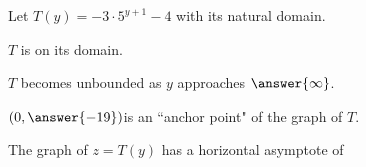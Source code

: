 \documentclass{ximera}
\author{Lee Wayand}
\begin{document}
\begin{exercise}




Let $T(y) = -3 \cdot 5^{y+1} - 4$ with its natural domain.


\begin{question}


$T$ is  on its domain. \\


\end{question}







\begin{question}


$T$ becomes unbounded as $y$ approaches $\answer{\infty}$.


\end{question}





\begin{question}


$\left( 0, \answer{-19} \right) $is an ``anchor point" of the graph of $T$. \\


\end{question}








\begin{question}


The graph of $z=T(y)$ has a horizontal asymptote of

\begin{multipleChoice}
\end{multipleChoice}


\end{question}








\end{exercise}
\end{document}
